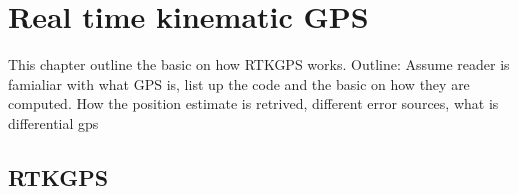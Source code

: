 
\chapter{Real time kinematic GPS}
This chapter outline the basic on how RTKGPS works. Outline: Assume reader is famialiar with what GPS is, list up the code and the basic on how they are computed. How the position estimate is retrived, different error sources, what is differential gps 
\section{RTKGPS}


\cleardoublepage